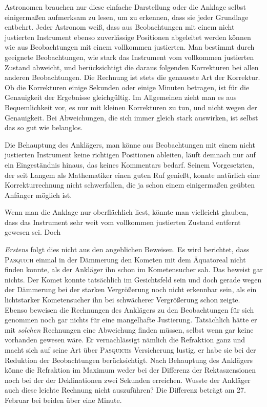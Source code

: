 Astronomen brauchen nur diese einfache Darstellung oder die Anklage selbst einigermaßen aufmerksam zu lesen, um zu erkennen, dass sie jeder Grundlage entbehrt. Jeder Astronom weiß, dass aus Beobachtungen mit einem nicht justierten Instrument ebenso zuverlässige Positionen abgeleitet werden können wie aus Beobachtungen mit einem vollkommen justierten. Man bestimmt durch geeignete Beobachtungen, wie stark das Instrument vom vollkommen justierten Zustand abweicht, und berücksichtigt die daraus folgenden Korrekturen bei allen anderen Beobachtungen. Die Rechnung ist stets die genaueste Art der Korrektur. Ob die  Korrekturen einige Sekunden oder einige Minuten betragen, ist für die Genauigkeit der Ergebnisse gleichgültig. Im Allgemeinen zieht man es aus Bequemlichkeit vor, es nur mit kleinen Korrekturen zu tun, und nicht wegen der Genauigkeit. Bei Abweichungen, die sich immer gleich stark auswirken, ist selbst das so gut wie belanglos.

Die Behauptung des Anklägers, man könne aus Beobachtungen mit einem nicht justierten Instrument keine richtigen Positionen ableiten, läuft demnach nur auf ein Eingeständnis hinaus, das keines Kommentars bedarf. Seinem Vorgesetzten, der seit Langem als Mathematiker einen guten Ruf genießt, konnte natürlich eine Korrekturrechnung nicht schwerfallen, die ja schon einem einigermaßen geübten Anfänger möglich ist.

Wenn man die Anklage nur oberflächlich liest, könnte man vielleicht glauben, dass das Instrument sehr weit vom vollkommen justierten Zustand entfernt gewesen sei. Doch

\emph{Erstens} folgt dies nicht aus den angeblichen Beweisen. Es wird berichtet, dass \textsc{Pasquich} einmal in der Dämmerung den Kometen mit dem Äquatoreal nicht finden konnte, als der Ankläger ihn schon im Kometensucher sah. Das beweist gar nichts. Der Komet konnte tatsächlich im Gesichtsfeld sein und doch gerade wegen der Dämmerung bei der starken Vergrößerung noch nicht erkennbar sein, als ein lichtstarker Kometensucher ihn bei schwächerer Vergrößerung schon zeigte. Ebenso beweisen die Rechnungen des Anklägers zu den Beobachtungen für sich genommen noch gar nichts für eine mangelhafte Justierung. Tatsächlich hätte er mit \emph{solchen} Rechnungen eine Abweichung finden müssen, selbst wenn gar keine vorhanden gewesen wäre. Er vernachlässigt nämlich die Refraktion ganz und macht sich auf seine Art über \textsc{Pasquich}s Versicherung lustig, er habe sie bei der Reduktion der Beobachtungen berücksichtigt. Nach Behauptung des Anklägers könne die Refraktion im Maximum weder bei der Differenz der Rektaszensionen noch bei der der Deklinationen zwei Sekunden erreichen. Wusste der Ankläger auch diese leichte Rechnung nicht auszuführen? Die Differenz beträgt am 27. Februar bei beiden über eine Minute.

